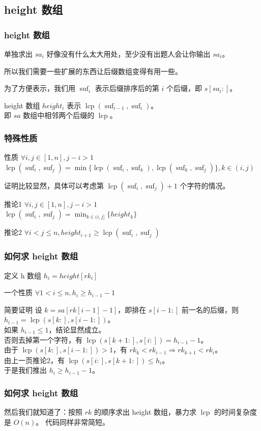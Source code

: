 \documentclass[UTF8]{beamer}
\newcommand{\lcp}{\operatorname{lcp}}
\newcommand{\suf}{\operatorname{suf}}
\begin{document}
\begin{CJK}{UTF8}{song}
\subsection{height 数组}
\begin{frame}
	\frametitle{height 数组}
	\pause
	\par
	单独求出 $sa_i$ 好像没有什么太大用处，至少没有出题人会让你输出 $sa_i$。
	\par
	所以我们需要一些扩展的东西让后缀数组变得有用一些。
	\pause
	\par
	为了方便表示，我们用 $\suf_i$ 表示后缀排序后的第 $i$ 个后缀，即 $s[sa_i:]$。
	\begin{block}{height 数组}
	$height_i$ 表示 $\lcp(\suf_{i-1},\suf_{i})$。\\
	即 $sa$ 数组中相邻两个后缀的 $\lcp$。
	\end{block}
\end{frame}
\begin{frame}
	\frametitle{特殊性质}
	\begin{block}{性质}
		$\forall i,j\in[1,n],j-i>1$\\
		$\lcp(\suf_i,\suf_j)=\min\{\lcp(\suf_{i},\suf_{k}),\lcp(\suf_k,\suf_j)\},k\in(i,j)$
	\end{block}
	\pause
	\par
	证明比较显然，具体可以考虑第 $\lcp(\suf_i,\suf_j)+1$ 个字符的情况。
	\pause
	\begin{block}{推论1}
		$\forall i,j\in[1,n],j-i>1$\\
		$\lcp(\suf_i,\suf_j)=\min_{k\in(i,j]}\{height_k\}$
	\end{block}
	\begin{block}{推论2}
		$\forall i<j\leq n,height_{i+1}\geq\lcp(\suf_i,\suf_j)$
	\end{block}
\end{frame}
\begin{frame}
	\frametitle{如何求 height 数组}
	\pause
	\begin{block}{定义 h 数组}
		$h_i=height[rk_i]$
	\end{block}
	\pause
	\begin{block}{一个性质}
		$\forall 1<i\leq n,h_{i}\geq h_{i-1}-1$
	\end{block}
	\pause
	\begin{block}{简要证明}
		设 $k=sa[rk[i-1]-1]$，即排在 $s[i-1:]$ 前一名的后缀，则 $h_{i-1}=\lcp(s[k:],s[i-1:])$。\\
		如果 $h_{i-1}\leq 1$，结论显然成立。\\
		否则去掉第一个字符，有 $\lcp(s[k+1:],s[i:])=h_{i-1}-1$。\\
		由于 $\lcp(s[k:],s[i-1:])>1$，有 $rk_k<rk_{i-1}\Rightarrow rk_{k+1}<rk_{i}$。\\
		由上一页推论2，有 $\lcp(s[i:],s[k+1:])\leq h_i$。\\
		于是我们推出 $h_i\geq h_{i-1}-1$。
	\end{block}
\end{frame}
\begin{frame}
	\frametitle{如何求 height 数组}
	然后我们就知道了：按照 $rk$ 的顺序求出 height 数组，暴力求 $\lcp$ 的时间复杂度是 $O(n)$。
	代码同样非常简短。
\end{frame}

\end{CJK}
\end{document}
